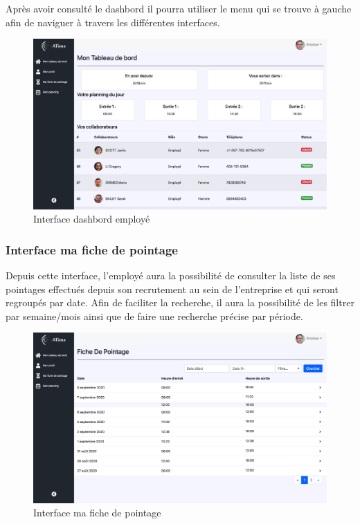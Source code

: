 Après avoir consulté le dashbord il pourra utiliser le menu qui se trouve à 
gauche afin de naviguer à travers les différentes interfaces.

\begin{figure}[h!]
    \centering
    \includegraphics[scale=0.35 ]{images/interface/dashbord_employe.png}
    \caption{Interface dashbord employé}
    \label{fig92}
\end{figure}

\subsubsection*{Interface ma fiche de pointage}
Depuis cette interface, l’employé aura la possibilité de consulter la liste de 
ses pointages effectués depuis son recrutement au sein de l’entreprise et qui 
seront regroupés par date. Afin de faciliter la recherche, il aura la 
possibilité de les filtrer par semaine/mois ainsi que de faire une recherche 
précise par période.

\begin{figure}[h!]
    \vspace{-10pt}
    \centering
    \includegraphics[scale=0.306 ]{images/interface/fiche_pointage.png}
    \caption{Interface ma fiche de pointage}
    \label{fig93}
\end{figure}

